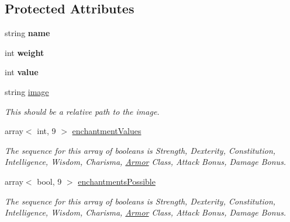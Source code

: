 \subsection*{Protected Attributes}
\begin{DoxyCompactItemize}
\item 
\hypertarget{class_item_a406cde7962a6b42a66b4a53c9a26db2c}{}\label{class_item_a406cde7962a6b42a66b4a53c9a26db2c} 
string {\bfseries name}
\item 
\hypertarget{class_item_a05e743552459fc8c2abdc80a0f4f0b0a}{}\label{class_item_a05e743552459fc8c2abdc80a0f4f0b0a} 
int {\bfseries weight}
\item 
\hypertarget{class_item_abee19400000e69cbd7aecadb6e93fa7b}{}\label{class_item_abee19400000e69cbd7aecadb6e93fa7b} 
int {\bfseries value}
\item 
\hypertarget{class_item_add84a42b692ee5d580a92ae4a922f784}{}\label{class_item_add84a42b692ee5d580a92ae4a922f784} 
string \hyperlink{class_item_add84a42b692ee5d580a92ae4a922f784}{image}
\begin{DoxyCompactList}\small\item\em This should be a relative path to the image. \end{DoxyCompactList}\item 
\hypertarget{class_item_a8532d8729f9433f41b7fc18b20d83236}{}\label{class_item_a8532d8729f9433f41b7fc18b20d83236} 
array$<$ int, 9 $>$ \hyperlink{class_item_a8532d8729f9433f41b7fc18b20d83236}{enchantment\+Values}
\begin{DoxyCompactList}\small\item\em The sequence for this array of booleans is Strength, Dexterity, Constitution, Intelligence, Wisdom, Charisma, \hyperlink{class_armor}{Armor} Class, Attack Bonus, Damage Bonus. \end{DoxyCompactList}\item 
\hypertarget{class_item_a02a91e8112849f4e2fde342b0c9a0d47}{}\label{class_item_a02a91e8112849f4e2fde342b0c9a0d47} 
array$<$ bool, 9 $>$ \hyperlink{class_item_a02a91e8112849f4e2fde342b0c9a0d47}{enchantments\+Possible}
\begin{DoxyCompactList}\small\item\em The sequence for this array of booleans is Strength, Dexterity, Constitution, Intelligence, Wisdom, Charisma, \hyperlink{class_armor}{Armor} Class, Attack Bonus, Damage Bonus. \end{DoxyCompactList}\end{DoxyCompactItemize}


